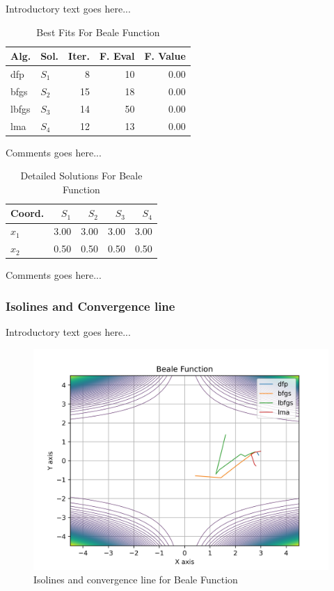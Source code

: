 \documentclass{ieeeaccess}
\begin{document}
Introductory text goes here...
\begin{table}
\centering
\caption{Best Fits For Beale Function}
\label{solutions:beale}
\begin{tabular}{llrrr}
\toprule
 Alg. &    Sol. &  Iter. &  F. Eval &  F. Value \\
\midrule
  dfp & $S_{1}$ &      8 &       10 &      0.00 \\
 bfgs & $S_{2}$ &     15 &       18 &      0.00 \\
lbfgs & $S_{3}$ &     14 &       50 &      0.00 \\
  lma & $S_{4}$ &     12 &       13 &      0.00 \\
\bottomrule
\end{tabular}
\end{table}


Comments goes here...
\begin{table}
\centering
\caption{Detailed Solutions For Beale Function}
\label{detailedsolutions:beale}
\begin{tabular}{lrrrr}
\toprule
 Coord. &  $S_{1}$ &  $S_{2}$ &  $S_{3}$ &  $S_{4}$ \\
\midrule
$x_{1}$ &     3.00 &     3.00 &     3.00 &     3.00 \\
$x_{2}$ &     0.50 &     0.50 &     0.50 &     0.50 \\
\bottomrule
\end{tabular}
\end{table}


Comments goes here...
\subsubsection{Isolines and Convergence line}
\label{isolinesbeale2D}


Introductory text goes here...
\begin{figure}[h]
\centering
\includegraphics[scale=0.5]{images/beale.jpg}
\caption{Isolines and convergence line for Beale Function}
\label{fig:beale}
\end{figure}
\end{document}

